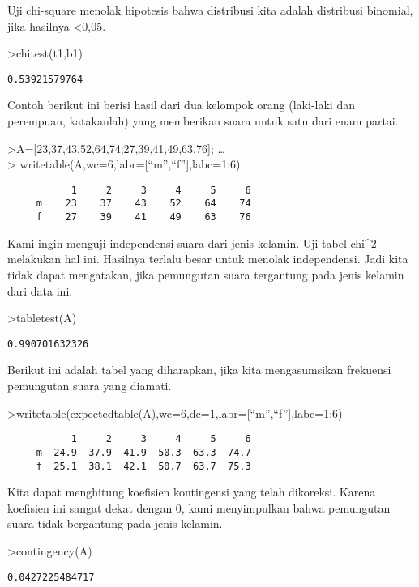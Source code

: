 \documentclass[
]{book}
\begin{document}
Uji chi-square menolak hipotesis bahwa distribusi kita adalah distribusi binomial, jika hasilnya \textless0,05.

\textgreater chitest(t1,b1)

\begin{verbatim}
0.53921579764
\end{verbatim}

Contoh berikut ini berisi hasil dari dua kelompok orang (laki-laki dan perempuan, katakanlah) yang memberikan suara untuk satu dari enam partai.

\textgreater A={[}23,37,43,52,64,74;27,39,41,49,63,76{]}; \ldots{}\\
\textgreater{} writetable(A,wc=6,labr={[}``m'',``f''{]},labc=1:6)

\begin{verbatim}
           1     2     3     4     5     6
     m    23    37    43    52    64    74
     f    27    39    41    49    63    76
\end{verbatim}

Kami ingin menguji independensi suara dari jenis kelamin. Uji tabel chi\^{}2 melakukan hal ini. Hasilnya terlalu besar untuk menolak independensi. Jadi kita tidak dapat mengatakan, jika pemungutan suara tergantung pada jenis kelamin dari data ini.

\textgreater tabletest(A)

\begin{verbatim}
0.990701632326
\end{verbatim}

Berikut ini adalah tabel yang diharapkan, jika kita mengasumsikan frekuensi pemungutan suara yang diamati.

\textgreater writetable(expectedtable(A),wc=6,dc=1,labr={[}``m'',``f''{]},labc=1:6)

\begin{verbatim}
           1     2     3     4     5     6
     m  24.9  37.9  41.9  50.3  63.3  74.7
     f  25.1  38.1  42.1  50.7  63.7  75.3
\end{verbatim}

Kita dapat menghitung koefisien kontingensi yang telah dikoreksi. Karena koefisien ini sangat dekat dengan 0, kami menyimpulkan bahwa pemungutan suara tidak bergantung pada jenis kelamin.

\textgreater contingency(A)

\begin{verbatim}
0.0427225484717
\end{verbatim}
\end{document}
